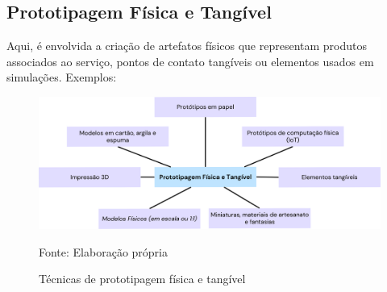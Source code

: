 \subsection{Prototipagem Física e Tangível}

Aqui, é envolvida a criação de artefatos físicos que representam produtos associados ao serviço, pontos de contato tangíveis ou elementos usados em simulações. Exemplos:

\begin{figure}[H]
	\centering
	\includegraphics[width=1\linewidth]{figuras/fisica-tangivel}
	\caption{Técnicas de prototipagem física e tangível}
	Fonte: Elaboração própria
	\label{fig:categorias-prototipacao}
\end{figure}

